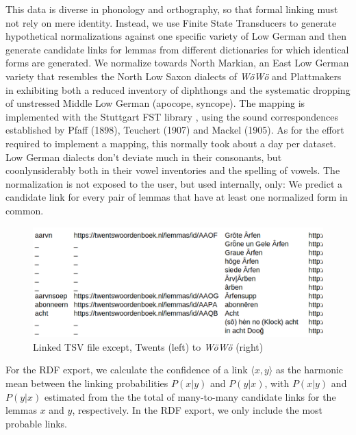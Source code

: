 This data is diverse in phonology and orthography, so that formal linking must not rely on mere identity. Instead, we use Finite State Transducers to generate hypothetical normalizations against one specific variety of Low German and then generate candidate links for lemmas from different dictionaries for which identical forms are generated. We normalize towards North Markian, an East Low German variety that resembles the North Low Saxon dialects of \emph{WöWö} and Plattmakers in exhibiting both a reduced inventory of diphthongs and the systematic dropping of unstressed Middle Low German  (apocope, syncope). The mapping is implemented with the Stuttgart FST library \cite[SFST]{schmid2006programming}, using the sound correspondences established by Pfaff (1898)\nocite{pfaff1898vocale}, Teuchert (1907)\nocite{teuchert1907mundart} and Mackel (1905)\nocite{mackel1905mundart}. As for the effort required to implement a mapping, this normally took about a day per dataset. Low German dialects don't deviate much in their consonants, but coonlynsiderably both in their vowel inventories and the spelling of vowels. The normalization is not exposed to the user, but used internally, only: We predict a candidate link for every pair of lemmas that have at least one normalized form in common.

\begin{figure}
    \flushleft
    \includegraphics[width=1\linewidth]{img/tsv-linked.png}
    \caption{Linked TSV file except, Twents (left) to \emph{WöWö} (right)}
    \label{fig-twents-woewoe}
\end{figure}

For the RDF export, we calculate the confidence of a link $\langle x,y\rangle$ as the harmonic mean between the linking probabilities $P(x|y)$ and $P(y|x)$, with $P(x|y)$ and $P(y|x)$  estimated from the the total of many-to-many candidate links for the lemmas $x$ and $y$, respectively. In the RDF export, we only include the most probable links. 

